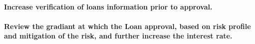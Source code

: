\documentclass[
]{article}
\begin{document}
\hypertarget{increase-verification-of-loans-information-prior-to-approval.}{%
\paragraph{Increase verification of loans information prior to
approval.}\label{increase-verification-of-loans-information-prior-to-approval.}}

\hypertarget{review-the-gradiant-at-which-the-loan-approval-based-on-risk-profile-and-mitigation-of-the-risk-and-further-increase-the-interest-rate.}{%
\paragraph{Review the gradiant at which the Loan approval, based on risk
profile and mitigation of the risk, and further increase the interest
rate.}\label{review-the-gradiant-at-which-the-loan-approval-based-on-risk-profile-and-mitigation-of-the-risk-and-further-increase-the-interest-rate.}}
\end{document}
